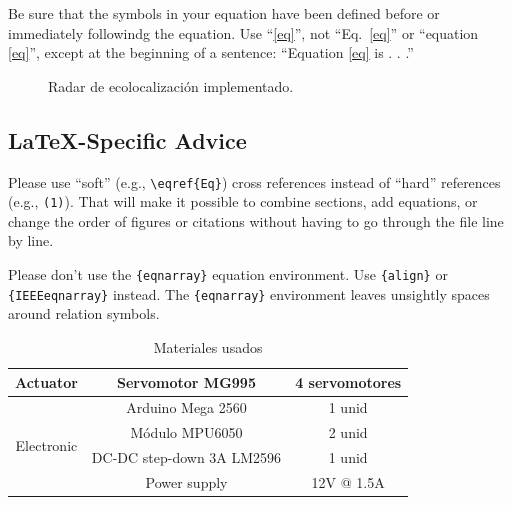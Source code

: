 \documentclass[conference]{IEEEtran}
\begin{document}
Be sure that the 
symbols in your equation have been defined before or immediately followindg 
the equation. Use ``\eqref{eq}'', not ``Eq.~\eqref{eq}'' or ``equation \eqref{eq}'', except at 
the beginning of a sentence: ``Equation \eqref{eq} is . . .''

\begin{figure}[h]
 \centering
    \hfill
 \caption{Radar de ecolocalización implementado.}
 \label{fig2}
\end{figure}

\subsection{\LaTeX-Specific Advice}

Please use ``soft'' (e.g., \verb|\eqref{Eq}|) cross references instead
of ``hard'' references (e.g., \verb|(1)|). That will make it possible
to combine sections, add equations, or change the order of figures or
citations without having to go through the file line by line.

Please don't use the \verb|{eqnarray}| equation environment. Use
\verb|{align}| or \verb|{IEEEeqnarray}| instead. The \verb|{eqnarray}|
environment leaves unsightly spaces around relation symbols.

\begin{table}[h]
\centering
\caption{Materiales usados}
\label{tabla:Characteristics-final}
\begin{tabular}{|c|c|c|}
\hline
Actuator                    & Servomotor MG995          & 4 servomotores \\ \hline
\multirow{4}{*}{Electronic} & Arduino Mega 2560         & 1 unid         \\ \cline{2-3} 
                            & Módulo MPU6050            & 2 unid         \\ \cline{2-3} 
                            & DC-DC step-down 3A LM2596 & 1 unid         \\ \cline{2-3} 
                            & Power supply              & 12V @ 1.5A     \\ \hline
\end{tabular}
\end{table}
\end{document}
